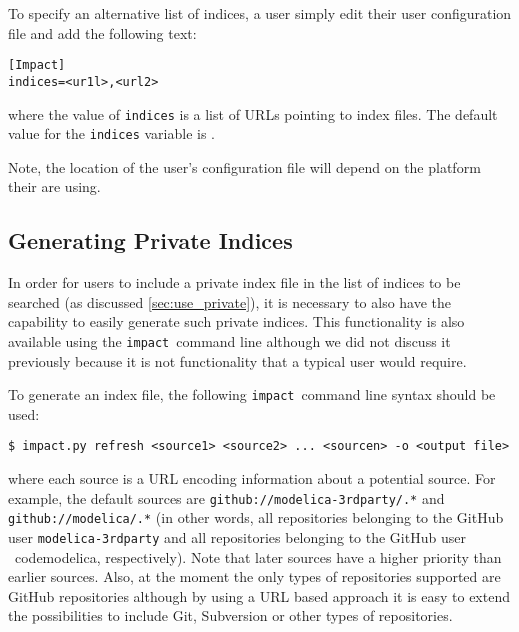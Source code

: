 \documentclass[11pt,a4paper,twocolumn]{article}
\newcommand{\impact}{\texttt{impact}} %
\newcommand{\code}[1]{\texttt{#1}} %
\begin{document}
To specify an alternative list of indices, a user simply edit their
user configuration file and add the following text:

\begin{verbatim}
[Impact]
indices=<ur1l>,<url2>
\end{verbatim}
where the value of \code{indices} is a list of URLs pointing to index files.  The 
default value for the \code{indices} variable is \code{}.


Note, the location of the user's configuration file will depend on the platform
their are using.

\subsection{Generating Private Indices}
\label{sec:gen_private}


In order for users to include a private index file in the list of indices to be 
searched (as discussed \ref{sec:use_private}), it is necessary to also have the
capability to easily generate such private indices.  This functionality is also 
available using the \impact\ command line although
we did not discuss it previously because it is not functionality that a
typical user would require.

To generate an index file, the following \impact\ command line syntax should
be used:

\begin{verbatim}
$ impact.py refresh <source1> <source2> ... <sourcen> -o <output file>
\end{verbatim}
where each source is a URL encoding information about a potential source.  For 
example, the default sources are \code{github://modelica-3rdparty/.*} and \code{
github://modelica/.*} (in other words, all repositories belonging to the GitHub 
user \code{modelica-3rdparty} and all repositories belonging to the GitHub user \
code{modelica}, respectively).  Note that later sources have a higher priority 
than earlier sources.  Also, at the moment the only types of repositories 
supported are GitHub repositories although by using a URL based approach it is
easy to extend the possibilities to include Git, Subversion or other types
of repositories.
\end{document}
